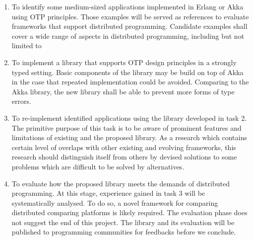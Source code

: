 \begin{enumerate}
  \item To identify some medium-sized applications implemented in Erlang or Akka using OTP principles.  Those examples will be served as references to evaluate frameworks that support distributed programming.  Candidate examples shall cover a wide range of aspects in distributed programming, including but not limited to 
    
  \item To implement a library that supports OTP design principles in a strongly typed setting.  Basic components of the library may be build on top of Akka\cite{akka_doc} in the case that repeated implementation could be avoided.  Comparing to the Akka library, the new library shall be able to prevent more forms of type errors.
    
  \item To re-implement identified applications using the library developed in task 2.  The primitive purpose of this task is to be aware of prominent features and limitations of existing and the proposed library.  As a research which contains certain level of overlaps with other existing and evolving frameworks, this research should distinguish itself from others by devised solutions to some problems which are difficult to be solved by alternatives.

  \item To evaluate how the proposed library meets the demands of distributed programming.  At this stage, experience gained in task 3 will be systematically analysed.  To do so, a novel framework for comparing distributed comparing platforms is likely required.  The evaluation phase does not suggest the end of this project.  The library and its evaluation will be published to programming communities for feedbacks before we conclude.
\end{enumerate}



